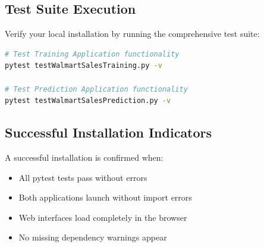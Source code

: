 \subsection{Test Suite Execution}

Verify your local installation by running the comprehensive test suite:

\begin{lstlisting}[language=bash]
# Test Training Application functionality
pytest testWalmartSalesTraining.py -v

# Test Prediction Application functionality  
pytest testWalmartSalesPrediction.py -v
\end{lstlisting}

\subsection{Successful Installation Indicators}

A successful installation is confirmed when:
\begin{itemize}
    \item All pytest tests pass without errors
    \item Both applications launch without import errors
    \item Web interfaces load completely in the browser
    \item No missing dependency warnings appear
\end{itemize}


